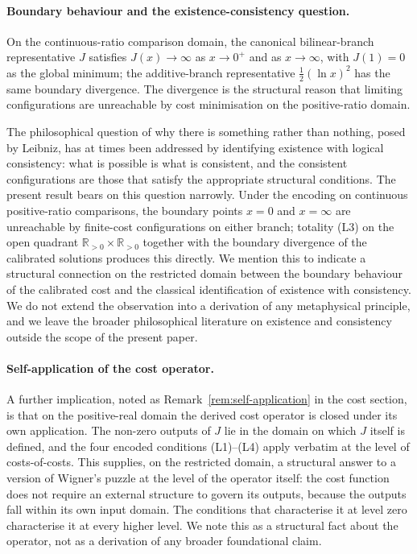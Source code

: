 \documentclass[11pt,a4paper]{article}
\theoremstyle{definition}
\theoremstyle{remark}
\begin{document}
\paragraph{Boundary behaviour and the existence-consistency question.}
On the continuous-ratio comparison domain, the canonical
bilinear-branch representative $J$ satisfies $J(x) \to \infty$ as
$x \to 0^+$ and as $x \to \infty$, with $J(1) = 0$ as the global
minimum; the additive-branch representative $\tfrac{1}{2}(\ln x)^2$
has the same boundary divergence. The divergence is the structural
reason that limiting configurations are unreachable by cost
minimisation on the positive-ratio domain.

The philosophical question of why there is something rather than
nothing, posed by Leibniz, has at times been addressed by identifying
existence with logical consistency: what is possible is what is
consistent, and the consistent configurations are those that satisfy
the appropriate structural conditions. The present result bears on
this question narrowly. Under the encoding on continuous positive-ratio
comparisons, the boundary points $x = 0$ and $x = \infty$ are
unreachable by finite-cost configurations on either branch; totality
(L3) on the open quadrant $\mathbb{R}_{>0} \times \mathbb{R}_{>0}$
together with the boundary divergence of the calibrated solutions
produces this directly. We mention this to indicate a structural
connection on the restricted domain between the boundary behaviour of
the calibrated cost and the classical identification of existence with
consistency. We do not extend the observation into a derivation of
any metaphysical principle, and we leave the broader philosophical
literature on existence and consistency outside the scope of the
present paper.

\paragraph{Self-application of the cost operator.} A further
implication, noted as Remark~\ref{rem:self-application} in the cost
section, is that on the positive-real domain the derived cost operator
is closed under its own application. The non-zero outputs of $J$ lie
in the domain on which $J$ itself is defined, and the four encoded
conditions (L1)--(L4) apply verbatim at the level of costs-of-costs.
This supplies, on the restricted domain, a structural answer to a
version of Wigner's puzzle at the level of the operator itself: the
cost function does not require an external structure to govern its
outputs, because the outputs fall within its own input domain. The
conditions that characterise it at level zero characterise it at every
higher level. We note this as a structural fact about the operator,
not as a derivation of any broader foundational claim.
\end{document}
